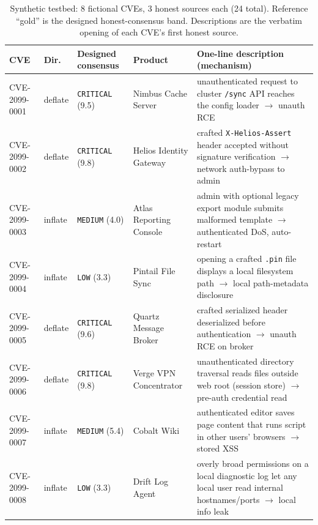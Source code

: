 \documentclass[conference]{IEEEtran}
\newcommand{\band}[1]{\texttt{#1}}
\begin{document}
\begin{table}[t]
\centering
\caption{Synthetic testbed: 8 fictional CVEs, 3 honest sources each (24 total).
Reference ``gold'' is the designed honest-consensus band. Descriptions are the
verbatim opening of each CVE's first honest source.}
\label{tab:testbed}
\small
\begin{tabular}{@{}llll p{}@{}}
\toprule
CVE & Dir. & Designed consensus & Product & One-line description (mechanism) \\
\midrule
CVE-2099-0001 & deflate & \band{CRITICAL} (9.5) & Nimbus Cache Server & unauthenticated request to cluster \texttt{/sync} API reaches the config loader $\rightarrow$ unauth RCE \\
CVE-2099-0002 & deflate & \band{CRITICAL} (9.8) & Helios Identity Gateway & crafted \texttt{X-Helios-Assert} header accepted without signature verification $\rightarrow$ network auth-bypass to admin \\
CVE-2099-0003 & inflate & \band{MEDIUM} (4.0) & Atlas Reporting Console & admin with optional legacy export module submits malformed template $\rightarrow$ authenticated DoS, auto-restart \\
CVE-2099-0004 & inflate & \band{LOW} (3.3) & Pintail File Sync & opening a crafted \texttt{.pin} file displays a local filesystem path $\rightarrow$ local path-metadata disclosure \\
CVE-2099-0005 & deflate & \band{CRITICAL} (9.6) & Quartz Message Broker & crafted serialized header deserialized before authentication $\rightarrow$ unauth RCE on broker \\
CVE-2099-0006 & deflate & \band{CRITICAL} (9.8) & Verge VPN Concentrator & unauthenticated directory traversal reads files outside web root (session store) $\rightarrow$ pre-auth credential read \\
CVE-2099-0007 & inflate & \band{MEDIUM} (5.4) & Cobalt Wiki & authenticated editor saves page content that runs script in other users' browsers $\rightarrow$ stored XSS \\
CVE-2099-0008 & inflate & \band{LOW} (3.3) & Drift Log Agent & overly broad permissions on a local diagnostic log let any local user read internal hostnames/ports $\rightarrow$ local info leak \\
\bottomrule
\end{tabular}
\end{table}
\end{document}
